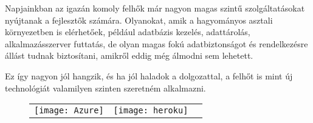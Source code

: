 Napjainkban az igazán komoly felhők már nagyon magas szintű szolgáltatásokat nyújtanak a fejlesztők számára. 
Olyanokat, amik a hagyományos asztali környezetben is elérhetőek, például adatbázis kezelés, adattárolás, alkalmazásszerver futtatás, de olyan magas fokú adatbiztonságot és rendelkezésre állást tudnak biztosítani, amikről eddig még álmodni sem lehetett.

Ez így nagyon jól hangzik, és ha jól haladok a dolgozattal, a felhőt is mint új technológiát valamilyen szinten szeretném alkalmazni.

\begin{figure}[h]
	\centering 
	\begin{tabular}{ccc}
		\texttt{[image: Azure]}
		&
		\texttt{[image: heroku]}
	\end{tabular}
\end{figure}


